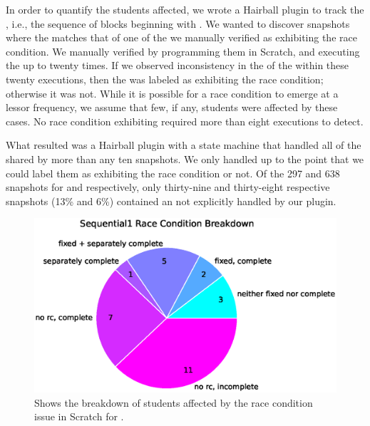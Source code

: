 In order to quantify the students affected, we wrote a Hairball plugin to track
the  \exe{}, i.e., the sequence of blocks beginning with
\netclicked{}. We wanted to discover snapshots where the  \exe{}
matches that of one of the  we manually verified as exhibiting the race
condition. We manually verified  by programming them in Scratch, and
executing the \sprogram{} up to twenty times. If we observed inconsistency in
the  of the \zebra{} within these twenty executions, then the \exe{}
was labeled as exhibiting the race condition; otherwise it was not. While it is
possible for a race condition to emerge at a lessor frequency, we assume that
few, if any, students were affected by these cases. No race condition
exhibiting \exe{} required more than eight executions to detect.

What resulted was a Hairball plugin with a state machine that handled all
 of the \net{} shared by more than any ten snapshots. We only handled
 up to the point that we could label them as exhibiting the race
condition or not. Of the 297 and 638 snapshots for \sone{} and \stwo{}
respectively, only thirty-nine and thirty-eight respective snapshots (13\% and
6\%) contained an \exe{} not explicitly handled by our plugin.

\begin{figure}[!t]
\centering \includegraphics[trim=0 .48in 0 0, clip, width=5.45in]{graphs/race_condition_Sequential1.eps}
\caption{Shows the breakdown of students affected by the race condition issue
  in Scratch for \sone{}.}
\end{figure}

